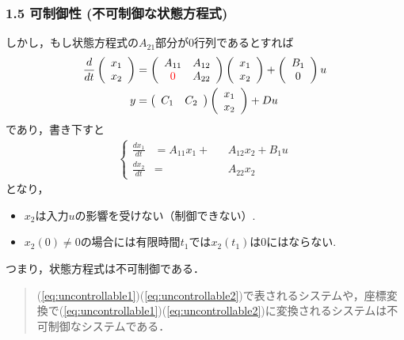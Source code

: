 \begin{frame}[t]
\frametitle{1.5 可制御性 (不可制御な状態方程式)}
しかし，もし状態方程式の$A_{21}$部分が$0$行列であるとすれば
\begin{align}
 \frac{d}{dt}
  \left(\begin{array}{c}
         {x}_1 \\
   {x}_2
  \end{array}\right)
  &=
  \left(\begin{array}{cc}
         {A}_{11} & {A}_{12} \\
       \Red{0}    & {A}_{22}
  \end{array}\right)
  \left(\begin{array}{c}
         {x}_1 \\
   {x}_2
  \end{array}\right)
  +
  \left(\begin{array}{c}
         {B}_1 \\
   0
  \end{array}\right)
  u
\label{eq:uncontrollable1}\\
 y &=
  \left(\begin{array}{cc}
         {C}_1 & {C}_2
  \end{array}\right)
  \left(\begin{array}{c}
         {x}_1 \\
   {x}_2
  \end{array}\right)
  + D u
\label{eq:uncontrollable2}\vspace{-2mm}
\end{align}
であり，書き下すと\vspace{-2mm}
\begin{align}
  \left\{
    \begin{alignedat}{3}
    \frac{d x_1}{dt} &= A_{11} x_1 +&& A_{12}x_2 + B_{1} u\\
    \frac{d x_2}{dt} &= &&A_{22}x_2
    \end{alignedat}
  \right. \label{eq:uncontrollable3}
\end{align}
となり，
\begin{itemize}
\item $x_2$は入力$u$の影響を受けない（制御できない）.

\item $x_2(0) \neq 0$の場合には有限時間$t_1$では$x_2(t_1)$は$0$にはならない.

\end{itemize}
つまり，状態方程式は不可制御である．
\begin{quote}
(\ref{eq:uncontrollable1})(\ref{eq:uncontrollable2})で表されるシステムや，座標変換で(\ref{eq:uncontrollable1})(\ref{eq:uncontrollable2})に変換されるシステムは不可制御なシステムである．
\end{quote}
\addtocounter{figure}{+1}
\end{frame}


